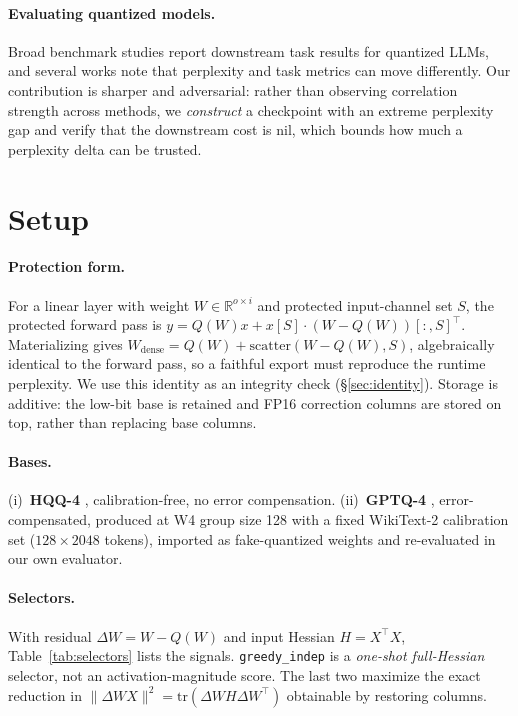 \documentclass[11pt]{article}
\begin{document}
\paragraph{Evaluating quantized models.} Broad benchmark studies
\citep{jin2024comprehensive} report downstream task results for quantized LLMs, and several
works note that perplexity and task metrics can move differently. Our contribution is sharper
and adversarial: rather than observing correlation strength across methods, we \emph{construct}
a checkpoint with an extreme perplexity gap and verify that the downstream cost is nil, which
bounds how much a perplexity delta can be trusted.

\section{Setup}
\label{sec:setup}

\paragraph{Protection form.} For a linear layer with weight $W \in \mathbb{R}^{o \times i}$ and
protected input-channel set $S$, the protected forward pass is
$y = Q(W)x + x[S]\cdot(W - Q(W))[:,S]^{\top}$. Materializing gives
$W_{\text{dense}} = Q(W) + \mathrm{scatter}(W - Q(W), S)$, algebraically identical to the
forward pass, so a faithful export must reproduce the runtime perplexity. We use this identity
as an integrity check (\S\ref{sec:identity}). Storage is additive: the low-bit base is retained
and FP16 correction columns are stored on top, rather than replacing base columns.

\paragraph{Bases.} (i)~\textbf{HQQ-4} \citep{badri2023hqq}, calibration-free, no error
compensation. (ii)~\textbf{GPTQ-4} \citep{frantar2023gptq}, error-compensated, produced at W4
group size 128 with a fixed WikiText-2 calibration set ($128 \times 2048$ tokens), imported as
fake-quantized weights and re-evaluated in our own evaluator.

\paragraph{Selectors.} With residual $\Delta W = W - Q(W)$ and input Hessian $H = X^{\top}X$,
Table~\ref{tab:selectors} lists the signals. \texttt{greedy\_indep} is a \emph{one-shot
full-Hessian} selector, not an activation-magnitude score. The last two maximize the exact
reduction in $\lVert \Delta W X\rVert^2 = \mathrm{tr}(\Delta W H \Delta W^{\top})$ obtainable
by restoring columns.
\end{document}
